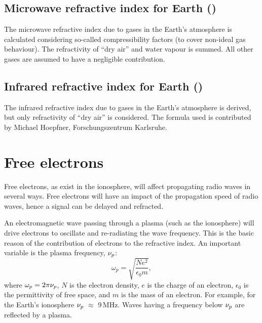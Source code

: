 \subsection{Microwave refractive index for Earth ()}
 \label{sec:rindex:thayer}
The microwave refractive index due to gases in the Earth’s atmosphere is
calculated considering so-called compressibility factors (to cover non-ideal gas
behaviour). The refractivity of ``dry air'' and water vapour is summed. All
other gases are assumed to have a negligible contribution.
\citep{thayer74_improved_rs}

\subsection{Infrared refractive index for Earth ()}
 \label{sec:rindex:IR}
The infrared refractive index due to gases in the Earth's atmosphere is derived,
but only refractivity of ``dry air'' is considered. The formula used is
contributed by Michael Hoepfner, Forschungszentrum Karlsruhe.


\section{Free electrons}
 \label{sec:rindex:freee}
%
Free electrons, as exist in the ionosphere, will affect propagating radio waves
in several ways. Free electrons will have an impact of the propagation speed of
radio waves, hence a signal can be delayed and refracted. 

An electromagnetic wave passing through a plasma (such as the ionosphere) will
drive electrons to oscillate and re-radiating the wave frequency. This is the
basic reason of the contribution of electrons to the refractive index. 
An important variable is the plasma frequency, $\nu_{p}$:
\begin{equation}
  \omega_{p}=\sqrt{\frac{Ne^{2}}{\epsilon_{0}m}},
\end{equation}
where \(\omega_{p}=2\pi\nu_{p}\), \(N\) is the electron density, \(e\) is the
charge of an electron, \(\epsilon_{0}\) is the permittivity of free space, and
\(m\) is the mass of an electron. For example, for the Earth's ionosphere
\(\nu_{p}\) \(\approx\) 9\,MHz.
Waves having a frequency below $\nu_{p}$ are reflected by a plasma.


